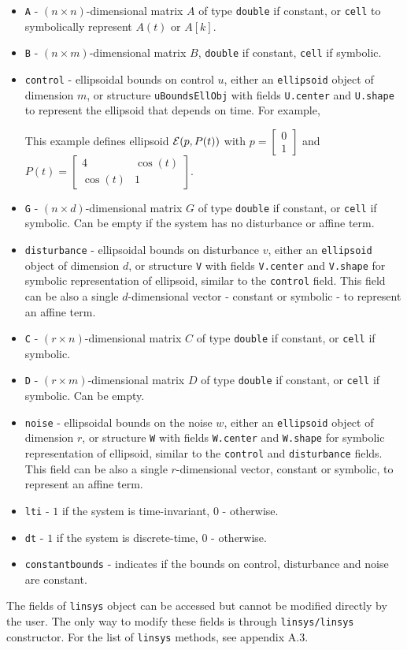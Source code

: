 \begin{itemize}
\item {\tt A} - $(n\times n)$-dimensional matrix $A$ of type {\tt double}
if constant, or {\tt cell} to symbolically represent $A(t)$ or $A[k]$.
\item {\tt B} - $(n\times m)$-dimensional matrix $B$, {\tt double} if constant,
{\tt cell} if symbolic.
\item {\tt control} - ellipsoidal bounds on control $u$,
either an {\tt ellipsoid}
object of dimension $m$, or structure {\tt uBoundsEllObj} with fields {\tt U.center} and
{\tt U.shape} to represent the ellipsoid that depends on time. For example,

This example defines ellipsoid $\EE(p, P(t))$ with $p=\left[\begin{array}{c}
0\\
1\end{array}\right]$ and $P(t) = \left[\begin{array}{cc}
4 & \cos(t)\\
\cos(t) & 1\end{array}\right]$.
\item {\tt G} - $(n\times d)$-dimensional matrix $G$ of type {\tt double}
if constant, or {\tt cell} if symbolic. Can be empty if the system has
no disturbance or affine term.
\item {\tt disturbance} - ellipsoidal bounds on disturbance $v$, either an
{\tt ellipsoid} object of dimension $d$, or structure {\tt V} with
fields {\tt V.center} and {\tt V.shape} for symbolic representation of
ellipsoid, similar to the {\tt control} field.
This field can be also a single $d$-dimensional vector - constant or symbolic -
to represent an affine term.
\item {\tt C} - $(r\times n)$-dimensional matrix $C$ of type {\tt double}
if constant, or {\tt cell} if symbolic.
\item {\tt D} - $(r\times m)$-dimensional matrix $D$ of type {\tt double}
if constant, or {\tt cell} if symbolic. Can be empty.
\item {\tt noise} - ellipsoidal bounds on the noise $w$, either an
{\tt ellipsoid} object of dimension $r$, or structure {\tt W} with
fields {\tt W.center} and {\tt W.shape} for symbolic representation of
ellipsoid, similar to the {\tt control} and {\tt disturbance} fields.
\newline
This field can be also a single $r$-dimensional vector, constant or symbolic,
to represent an affine term.
\item {\tt lti} - $1$ if the system is time-invariant, $0$ - otherwise.
\item {\tt dt} - $1$ if the system is discrete-time, $0$ - otherwise.
\item {\tt constantbounds} - indicates if the bounds on control, disturbance
and noise are constant.
\end{itemize}
The fields of {\tt linsys} object can be accessed but cannot be modified
directly by the user. The only way to modify these fields is through
{\tt linsys/linsys} constructor.
For the list of {\tt linsys} methods, see appendix A.3.



